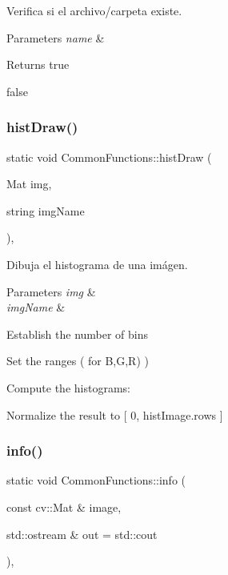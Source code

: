 Verifica si el archivo/carpeta existe. 


\begin{DoxyParams}{Parameters}
{\em name} & \\
\hline
\end{DoxyParams}
\begin{DoxyReturn}{Returns}
true 

false 
\end{DoxyReturn}
\mbox{\label{classCommonFunctions_a7b0e52ec4c30af5244724936f163c2d1}} 
\subsubsection{\texorpdfstring{hist\+Draw()}{histDraw()}}
{\footnotesize\ttfamily static void Common\+Functions\+::hist\+Draw (\begin{DoxyParamCaption}\item[{Mat}]{img,  }\item[{string}]{img\+Name }\end{DoxyParamCaption})\hspace{0.3cm}{\ttfamily [inline]}, {\ttfamily [static]}}



Dibuja el histograma de una imágen. 


\begin{DoxyParams}{Parameters}
{\em img} & \\
\hline
{\em img\+Name} & \\
\hline
\end{DoxyParams}
Establish the number of bins

Set the ranges ( for B,G,R) )

Compute the histograms\+:

Normalize the result to \mbox{[} 0, hist\+Image.\+rows \mbox{]} \mbox{\label{classCommonFunctions_a51a3e18bdcc2c918ebc81f0cc1f47851}} 
\subsubsection{\texorpdfstring{info()}{info()}}
{\footnotesize\ttfamily static void Common\+Functions\+::info (\begin{DoxyParamCaption}\item[{const cv\+::\+Mat \&}]{image,  }\item[{std\+::ostream \&}]{out = {\ttfamily std\+:\+:cout} }\end{DoxyParamCaption})\hspace{0.3cm}{\ttfamily [inline]}, {\ttfamily [static]}}



